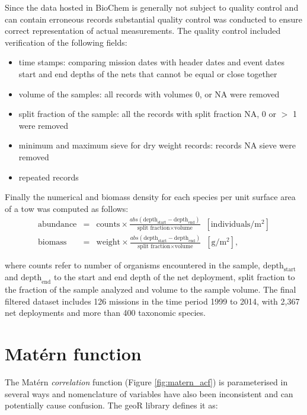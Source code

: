 \documentclass[letterpaper,portrait,11pt]{scrartcl}
\numberwithin{equation}{section}    %
\numberwithin{figure}{section}    %
\numberwithin{table}{section}       %
\begin{document}
\begin{appendices}
Since the data hosted in BioChem is generally not subject to quality control and can contain erroneous records substantial quality control was conducted to ensure correct representation of actual measurements. The quality control included verification of the following fields:

\begin{itemize}
  \item time stamps: comparing mission dates with header dates and event dates
  start and end depths of the nets that cannot be equal or close together
  \item volume of the samples: all records with volumes 0, or NA were removed
  \item split fraction of the sample: all the records with split fraction NA, 0 or $>$ 1 were removed
  \item minimum and maximum sieve for dry weight records: records NA sieve were removed
  \item repeated records
\end{itemize}


Finally the numerical and biomass density for each species per unit surface area of a tow was computed as follows:
\begin{eqnarray*}
\text{abundance} &=& \text{counts} \times \frac{  abs( \text{depth}_{\text{start}} - \text{depth}_{\text{end}} ) } { \text{split fraction} \times \text{volume} } \; \; [\text{individuals}/ \text{m}^{2} ]  \\
\text{biomass} &=& \text{weight} \times \frac{ abs( \text{depth}_{\text{start}} - \text{depth}_{\text{end}} )} { \text{split fraction} \times \text{volume}} \; \; [\text{g}/\text{m}^2],
\end{eqnarray*}

where counts refer to number of organisms encountered in the sample, $\text{depth}_{\text{start}}$ and $\text{depth}_{\text{end}}$ to the start and end depth of the net deployment, split fraction to the fraction of the sample analyzed and volume to the sample volume. The final filtered dataset includes 126 missions in the time period 1999 to 2014, with 2,367 net deployments and more than 400 taxonomic species.

\section{Mat\'{e}rn function}
\label{sec:matern}

The Mat\'{e}rn \textit{correlation} function (Figure \ref{fig:matern_acf}) is parameterised in several ways and nomenclature of variables have also been inconsistent and can potentially cause confusion. The geoR library \parencite{diggle:2007, ribeiro:2001} defines it as:


\end{appendices}
\end{document}
